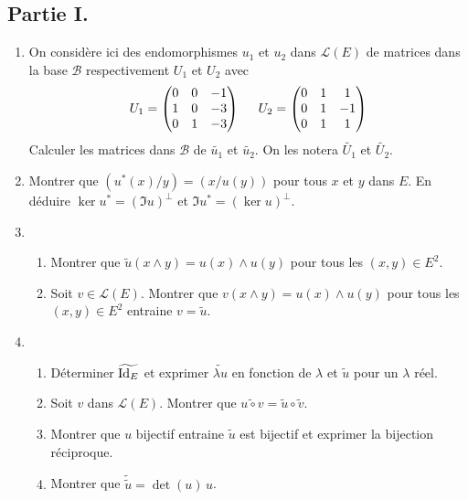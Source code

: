 \subsection*{Partie I.}
\begin{enumerate}
 \item On considère ici des endomorphismes $u_1$ et $u_2$ dans $\mathcal{L}(E)$ de matrices dans la base $\mathcal{B}$ respectivement $U_1$ et $U_2$ avec
\begin{displaymath}
 U_1=
\begin{pmatrix}
 0 & 0 & -1 \\ 1 & 0 & -3 \\ 0 & 1 &-3
\end{pmatrix}
\hspace{0.5cm}
U_2=
\begin{pmatrix}
 0 & 1 & 1 \\ 0 & 1 & -1 \\ 0 & 1 & 1
\end{pmatrix}
\end{displaymath}
Calculer les matrices dans $\mathcal{B}$ de $\widetilde{u_1}$ et $\widetilde{u_2}$. On les notera $\widetilde{U_1}$ et $\widetilde{U_2}$.
\item Montrer que $(u^*(x)/y)=(x/u(y))$ pour tous $x$ et $y$ dans $E$.\newline
 En déduire $\ker u^* = (\Im u)^{\perp}$ et $\Im u^* = (\ker u)^{\perp}$.
\item 
\begin{enumerate}
 \item Montrer que $\widetilde{u}(x\wedge y) = u(x)\wedge u(y)$ pour tous les $(x,y)\in E^2$.
 \item Soit $v\in \mathcal{L}(E)$. Montrer que $v(x\wedge y) = u(x)\wedge u(y)$ pour tous les $(x,y)\in E^2$ entraine $v = \widetilde{u}$. 
\end{enumerate}
\item 
\begin{enumerate}
 \item Déterminer $\widetilde{\operatorname{Id}_E}$ et exprimer $\widetilde{\lambda u}$ en fonction de $\lambda$ et $\widetilde{u}$ pour un $\lambda$ réel.
 \item Soit $v$ dans $\mathcal{L}(E)$. Montrer que $\widetilde{u \circ v} = \widetilde{u} \circ \widetilde{v}$.
 \item Montrer que $u$ bijectif entraine $\widetilde{u}$ est bijectif et exprimer la bijection réciproque.
 \item Montrer que $\widetilde{\widetilde{u}} = \det(u)\,u$.

\end{enumerate}
\end{enumerate}
